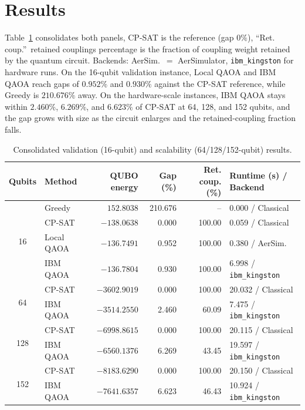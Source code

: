 \documentclass[runningheads]{llncs}
\begin{document}
\section{Results}
\label{sec:results}
Table~\ref{tab:results} consolidates both panels, CP-SAT is the reference (gap $0\%$), ``Ret. coup.''\ retained couplings percentage is the fraction of coupling weight retained by the quantum circuit. Backends: AerSim.\ $=$ AerSimulator, \texttt{ibm\_kingston} for hardware runs. On the 16-qubit validation instance, Local QAOA and IBM QAOA reach gaps of $0.952\%$ and $0.930\%$ against the CP-SAT reference, while Greedy is $210.676\%$ away. On the hardware-scale instances, IBM QAOA stays within $2.460\%$, $6.269\%$, and $6.623\%$ of CP-SAT at 64, 128, and 152 qubits, and the gap grows with size as the circuit enlarges and the retained-coupling fraction falls.

\begin{table}
\centering
\caption{Consolidated validation (16-qubit) and scalability (64/128/152-qubit) results.}
\label{tab:results}
\small
\begin{tabular}{|c|l|r|r|r|l|}
\hline
Qubits & Method & QUBO energy & Gap (\%) & Ret. coup. (\%) & Runtime (s) / Backend \\
\hline
\multirow{4}{*}{16} 
& Greedy     & $152.8038$  & 210.676 & --     & 0.000 / Classical \\
\cline{2-6}
& CP-SAT     & $-138.0638$ & 0.000   & 100.00 & 0.059 / Classical \\
\cline{2-6}
& Local QAOA & $-136.7491$ & 0.952   & 100.00 & 0.380 / AerSim. \\
\cline{2-6}
& IBM QAOA   & $-136.7804$ & 0.930   & 100.00 & 6.998 / \texttt{ibm\_kingston} \\
\hline
\multirow{2}{*}{64} 
& CP-SAT     & $-3602.9019$ & 0.000  & 100.00 & 20.032 / Classical \\
\cline{2-6}
& IBM QAOA   & $-3514.2550$ & 2.460  & 60.09  & 7.475 / \texttt{ibm\_kingston} \\
\hline
\multirow{2}{*}{128} 
& CP-SAT     & $-6998.8615$ & 0.000  & 100.00 & 20.115 / Classical \\
\cline{2-6}
& IBM QAOA   & $-6560.1376$ & 6.269  & 43.45  & 19.597 / \texttt{ibm\_kingston} \\
\hline
\multirow{2}{*}{152} 
& CP-SAT     & $-8183.6290$ & 0.000  & 100.00 & 20.150 / Classical \\
\cline{2-6}
& IBM QAOA   & $-7641.6357$ & 6.623  & 46.43  & 10.924 / \texttt{ibm\_kingston} \\
\hline
\end{tabular}
\end{table}
\end{document}
